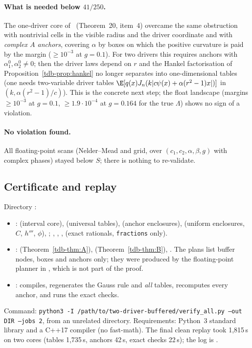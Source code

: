 \paragraph{What is needed below $41/250$.} The one-driver core of \Sd\ (Theorem~20, item~4) overcame the same obstruction with nontrivial cells in the
visible radius and the driver coordinate and with \emph{complex $A$ anchors}, covering $\alpha$ by boxes on which the positive curvature is paid by
the margin ($\ge10^{-3}$ at $g=0.1$). For two drivers this requires anchors with $\alpha^0_1,\alpha^0_2\ne0$; then the driver laws depend on $r$ and the
Hankel factorisation of Proposition~\ref{tdb-prop:hankel} no longer separates into one-dimensional tables (one needs two-variable driver tables
$\E[q(x)J_n(k|c\psi(x)+\alpha(r^2-1)x|)]$ in $(k,\alpha(r^2-1)/c)$). This is the concrete next step; the float landscape (margins $\ge10^{-3}$ at $g=0.1$,
$\ge1.9\cdot10^{-4}$ at $g=0.164$ for the true $\Lambda$) shows no sign of a violation.

\paragraph{No violation found.} All floating-point scans (Nelder--Mead and grid, over $(c_1,c_2,\alpha,\beta,g)$ with complex phases) stayed below $S$;
there is nothing to re-validate.

\subsection{Certificate and replay}
Directory :
\begin{itemize}
\item {}:  (interval core),  (universal tables), 
(anchor enclosures),  (uniform enclosures, $C$, $h'''$, $\phi$), ; , ,
,  (exact rationals, \texttt{fractions} only).
\item {}:  (Theorem~\ref{tdb-thm:A}),  (Theorem~\ref{tdb-thm:B}), . The plans list buffer nodes,
boxes and anchors only; they were produced by the floating-point planner in , which is not part of the proof.
\item {}: compiles, regenerates the Gauss rule and \emph{all} tables, recomputes every anchor, and runs the exact checks.
\end{itemize}
Command: \texttt{python3 -I /path/to/two-driver-buffered/verify\_all.py --out DIR --jobs 2}, from an unrelated directory. Requirements: Python~3
standard library and a C++17 compiler (no fast-math). The final clean replay took 1{,}815\,s on two cores (tables 1{,}735\,s, anchors 42\,s, exact checks 22\,s); the
log is .

